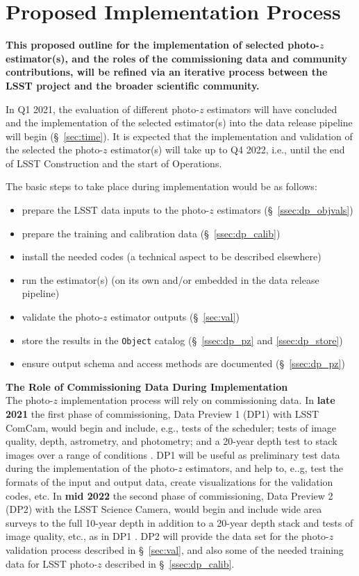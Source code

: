 \documentclass[DM,lsstdraft,toc]{lsstdoc}
\begin{document}
\clearpage
\section{Proposed Implementation Process}\label{sec:imp}

\textbf{This proposed outline for the implementation of selected photo-$z$ estimator(s), and the roles of the commissioning data and community contributions, will be refined via an iterative process between the LSST project and the broader scientific community.}

In Q1 2021, the evaluation of different photo-$z$ estimators will have concluded and the implementation of the selected estimator(s) into the data release pipeline will begin (\S~\ref{sec:time}).
It is expected that the implementation and validation of the selected the photo-$z$ estimator(s) will take up to Q4 2022, i.e., until the end of LSST Construction and the start of Operations.

The basic steps to take place during implementation would be as follows:
\vspace{-15pt}
\begin{itemize}
\item prepare the LSST data inputs to the photo-$z$ estimators (\S~\ref{ssec:dp_objvals})
\item prepare the training and calibration data (\S~\ref{ssec:dp_calib})
\item install the needed codes (a technical aspect to be described elsewhere)
\item run the estimator(s) (on its own and/or embedded in the data release pipeline)
\item validate the photo-$z$ estimator outputs (\S~\ref{sec:val})
\item store the results in the {\tt Object} catalog (\S~\ref{ssec:dp_pz} and \ref{ssec:dp_store})
\item ensure output schema and access methods are documented (\S~\ref{ssec:dp_pz})
\end{itemize}


\textbf{The Role of Commissioning Data During Implementation}\\
The photo-$z$ implementation process will rely on commissioning data.
In {\bf late 2021} the first phase of commissioning, Data Preview 1 (DP1) with LSST ComCam, would begin and include, e.g., tests of the scheduler; tests of image quality, depth, astrometry, and photometry; and a 20-year depth test to stack images over a range of conditions .
DP1 will be useful as preliminary test data during the implementation of the photo-$z$ estimators, and help to, e..g, test the formats of the input and output data, create visualizations for the validation codes, etc.
In {\bf mid 2022} the second phase of commissioning, Data Preview 2 (DP2) with the LSST Science Camera, would begin and include wide area surveys to the full 10-year depth in addition to a 20-year depth stack and tests of image quality, etc., as in DP1 .
DP2 will provide the data set for the photo-$z$ validation process described in \S~\ref{sec:val}, and also some of the needed training data for LSST photo-$z$ described in \S~\ref{ssec:dp_calib}.
\end{document}
